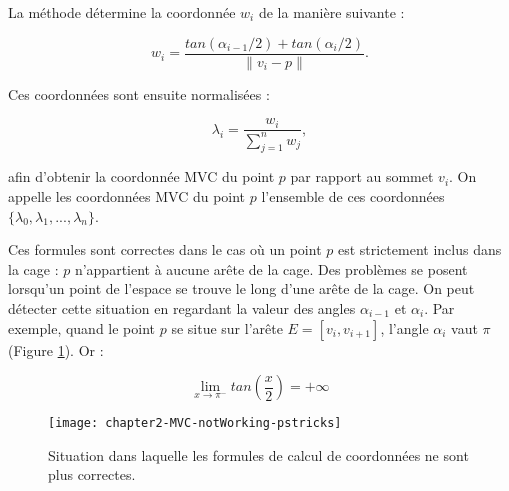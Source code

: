 La méthode détermine la coordonnée $w_i$ de la manière suivante :

\begin{equation}
  w_i = \frac{tan(\alpha_{i-1}/2) + tan(\alpha_i/2)}{\| v_i - p \|}.
  \label{DEFcoo}
\end{equation}

Ces coordonnées sont ensuite normalisées :

\begin{equation}
  \lambda_i = \frac{w_i}{\sum_{j=1}^n w_j},
\end{equation}

afin d'obtenir la coordonnée MVC du point $p$ par rapport au sommet $v_i$. On
appelle les coordonnées MVC du point $p$ l'ensemble de ces coordonnées
$\{\lambda_0, \lambda_1, ..., \lambda_n\}$.





Ces formules sont correctes dans le cas où un point $p$ est strictement inclus
dans la cage : $p$ n'appartient à aucune arête de la cage. Des problèmes se
posent lorsqu'un point de l'espace se trouve le long d'une arête de la cage.
On peut détecter cette situation en regardant la valeur des angles
$\alpha_{i-1}$ et $\alpha_i$. Par exemple, quand le point $p$ se situe sur
l'arête $E = [v_i,v_{i+1}]$, l'angle $\alpha_i$ vaut $\pi$ (Figure
\ref{DEFinc}). Or :

\begin{displaymath}
  \lim\limits_{x \to \pi^-} tan(\frac{x}{2}) = +\infty
\end{displaymath}

\begin{figure}[ht]
  \begin{center}
    \texttt{[image: chapter2-MVC-notWorking-pstricks]}

    \caption[Cas particulier MVC] {Situation dans laquelle les
formules de calcul de coordonnées ne sont plus correctes.}

    \label{DEFinc}
  \end{center}
\end{figure}

